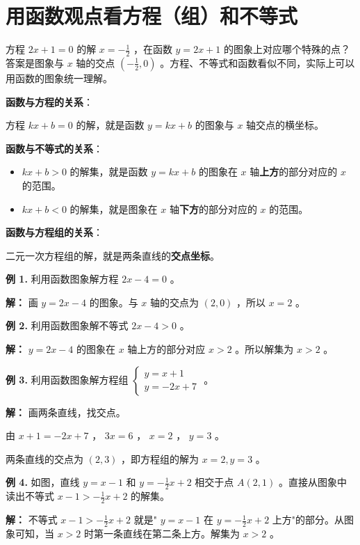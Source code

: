 \section*{用函数观点看方程（组）和不等式}


\begin{explore}


方程 $2x + 1 = 0$ 的解 $x = -\frac{1}{2}$ ，在函数 $y = 2x + 1$ 的图象上对应哪个特殊的点？答案是图象与 $x$ 轴的交点 $(-\frac{1}{2}, 0)$ 。方程、不等式和函数看似不同，实际上可以用函数的图象统一理解。

\end{explore}

\begin{understand}


\textbf{函数与方程的关系}：

方程 $kx + b = 0$ 的解，就是函数 $y = kx + b$ 的图象与 $x$ 轴交点的横坐标。

\textbf{函数与不等式的关系}：

\begin{itemize}
  \item $kx + b > 0$ 的解集，就是函数 $y = kx + b$ 的图象在 $x$ 轴\textbf{上方}的部分对应的 $x$ 的范围。
  \item $kx + b < 0$ 的解集，就是图象在 $x$ 轴\textbf{下方}的部分对应的 $x$ 的范围。
\end{itemize}


\textbf{函数与方程组的关系}：

二元一次方程组的解，就是两条直线的\textbf{交点坐标}。

\end{understand}

\begin{workedexamples}


\textbf{例 1.} 利用函数图象解方程 $2x - 4 = 0$ 。

\textbf{解：} 画 $y = 2x - 4$ 的图象。与 $x$ 轴的交点为 $(2, 0)$ ，所以 $x = 2$ 。

\textbf{例 2.} 利用函数图象解不等式 $2x - 4 > 0$ 。

\textbf{解：} $y = 2x - 4$ 的图象在 $x$ 轴上方的部分对应 $x > 2$ 。所以解集为 $x > 2$ 。

\textbf{例 3.} 利用函数图象解方程组 $\begin{cases} y = x + 1 \\ y = -2x + 7 \end{cases}$ 。

\textbf{解：} 画两条直线，找交点。

由 $x + 1 = -2x + 7$ ， $3x = 6$ ， $x = 2$ ， $y = 3$ 。

两条直线的交点为 $(2, 3)$ ，即方程组的解为 $x = 2, y = 3$ 。

\textbf{例 4.} 如图，直线 $y = x - 1$ 和 $y = -\frac{1}{2}x + 2$ 相交于点 $A(2, 1)$ 。直接从图象中读出不等式 $x - 1 > -\frac{1}{2}x + 2$ 的解集。

\textbf{解：} 不等式 $x - 1 > -\frac{1}{2}x + 2$ 就是" $y = x - 1$ 在 $y = -\frac{1}{2}x + 2$ 上方"的部分。从图象可知，当 $x > 2$ 时第一条直线在第二条上方。解集为 $x > 2$ 。

\end{workedexamples}


